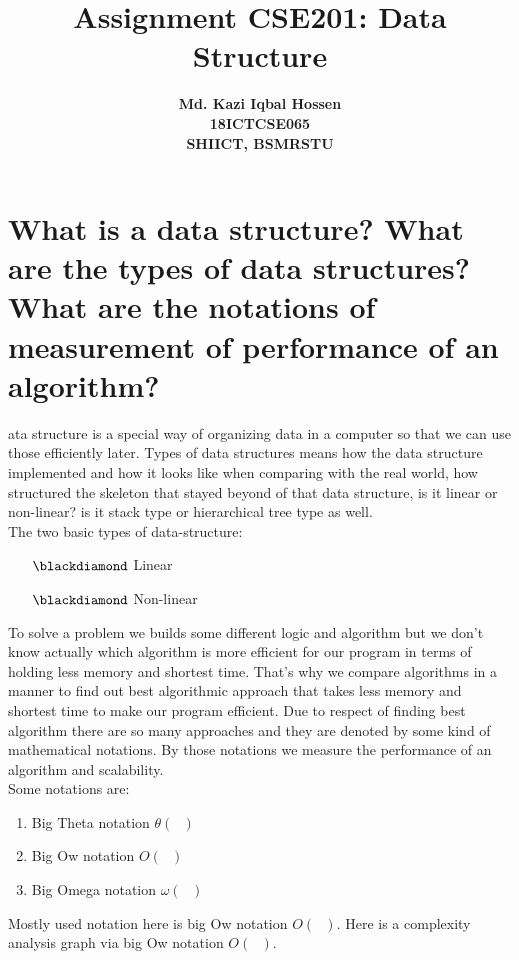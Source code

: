 \documentclass[11 pt]{article}
\title{Assignment CSE201: Data Structure}
\author{\textbf{{\large Md. Kazi Iqbal Hossen}}\\\textbf{18ICTCSE065}\\\textbf{SHIICT, BSMRSTU}}
\begin{document}
\pagecolor{LightSlateGray}

\pagecolor{white}
\tableofcontents
\listoffigures
\pagebreak

\section{What is a data structure? What are the types of data structures? What are the notations of measurement of performance of an algorithm?}
\justify
{
ata structure is a special way of organizing data in a computer so that we can use those efficiently later. Types of data structures means how the data structure implemented and how it looks like when comparing with the real world, how structured the skeleton that stayed beyond of that data structure, is it linear or non-linear? is it stack type or hierarchical tree type as well.\\
The two basic types of data-structure:
\begin{enumerate}
	\item[$\blackdiamond$] Linear
	\item[$\blackdiamond$] Non-linear
\end{enumerate}
To solve a problem we builds some different logic and algorithm but we don't know actually which algorithm is more efficient for our program in terms of holding less memory and shortest time. That's why we compare algorithms in a manner to find out best algorithmic approach that takes less memory and shortest time to make our program efficient. Due to respect of finding best algorithm there are so many approaches and they are denoted by some kind of mathematical notations. By those notations we measure the performance of an algorithm and scalability.\\
Some notations are:
\begin{enumerate}
	\item Big Theta notation $\theta(\textrm{ })$
	\item Big Ow notation $O(\textrm{ })$
	\item Big Omega notation $\omega(\textrm{ })$
\end{enumerate}
 Mostly used notation here is big Ow notation $O(\textrm{ })$. Here is a complexity analysis graph via big Ow notation $O(\textrm{ })$.
}
\end{document}
